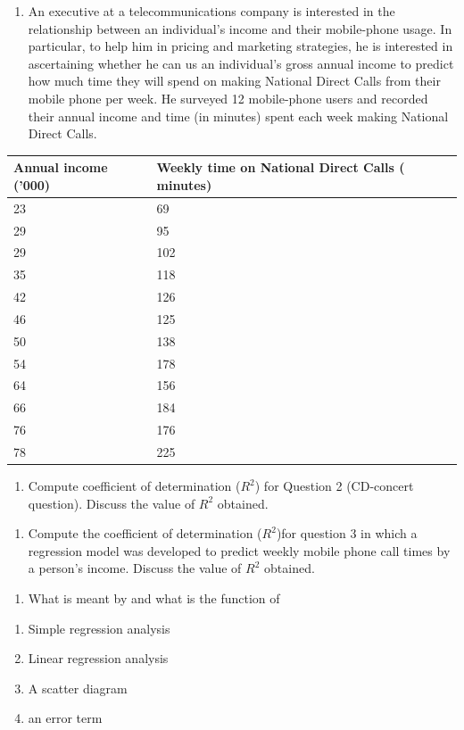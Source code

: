 \documentclass[]{book}
\providecommand{\tightlist}{%
  \setlength{\itemsep}{0pt}\setlength{\parskip}{0pt}}
\begin{document}
\begin{enumerate}
\def\labelenumi{\arabic{enumi}.}
\setcounter{enumi}{2}
\tightlist
\item
  An executive at a telecommunications company is interested in the relationship between an individual's income and their mobile-phone usage. In particular, to help him in pricing and marketing strategies, he is interested in ascertaining whether he can us an individual's gross annual income to predict how much time they will spend on making National Direct Calls from their mobile phone per week. He surveyed 12 mobile-phone users and recorded their annual income and time (in minutes) spent each week making National Direct Calls.
\end{enumerate}

\begin{longtable}[]{@{}ll@{}}
\toprule
Annual income ('000) & Weekly time on National Direct Calls ( minutes)\tabularnewline
\midrule
\endhead
23 & 69\tabularnewline
29 & 95\tabularnewline
29 & 102\tabularnewline
35 & 118\tabularnewline
42 & 126\tabularnewline
46 & 125\tabularnewline
50 & 138\tabularnewline
54 & 178\tabularnewline
64 & 156\tabularnewline
66 & 184\tabularnewline
76 & 176\tabularnewline
78 & 225\tabularnewline
\bottomrule
\end{longtable}

\begin{enumerate}
\def\labelenumi{\arabic{enumi}.}
\setcounter{enumi}{3}
\tightlist
\item
  Compute coefficient of determination (\(R^2\)) for Question 2 (CD-concert question). Discuss the value of \(R^2\) obtained.
\end{enumerate}

\begin{enumerate}
\def\labelenumi{\arabic{enumi}.}
\setcounter{enumi}{4}
\tightlist
\item
  Compute the coefficient of determination (\(R^2\))for question 3 in which a regression model was developed to predict weekly mobile phone call times by a person's income. Discuss the value of \(R^2\) obtained.
\end{enumerate}

\begin{enumerate}
\def\labelenumi{\arabic{enumi}.}
\setcounter{enumi}{5}
\tightlist
\item
  What is meant by and what is the function of
\end{enumerate}

\begin{enumerate}
\def\labelenumi{\alph{enumi})}
\tightlist
\item
  Simple regression analysis
\item
  Linear regression analysis
\item
  A scatter diagram
\item
  an error term
\end{enumerate}
\end{document}
